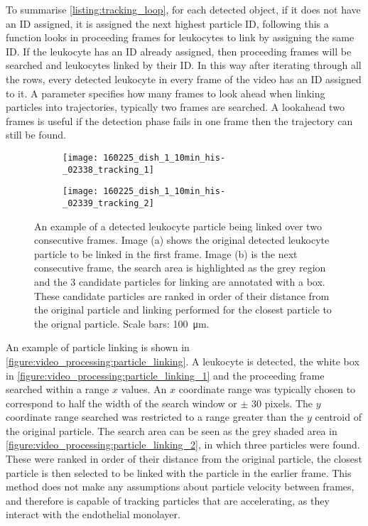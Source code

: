 To summarise \autoref{listing:tracking_loop}, for each detected object, if it does not have an ID assigned, it is assigned the next highest particle ID, following this a function looks in proceeding frames for leukocytes to link by assigning the same ID. If the leukocyte has an ID already assigned, then proceeding frames will be searched and leukocytes linked by their ID. In this way after iterating through all the rows, every detected leukocyte in every frame of the video has an ID assigned to it. A parameter specifies how many frames to look ahead when linking particles into trajectories, typically two frames are searched. A lookahead two frames is useful if the detection phase fails in one frame then the trajectory can still be found.

\begin{figure}[htbp]{}
	\centering
	\begin{subfigure}[b]{0.49\linewidth}
		\texttt{[image: 160225\_dish\_1\_10min\_his-\_02338\_tracking\_1]}
		\caption{}
		\label{figure:video_processing:particle_linking_1}
	\end{subfigure}
	\begin{subfigure}[b]{0.49\linewidth}
		\texttt{[image: 160225\_dish\_1\_10min\_his-\_02339\_tracking\_2]}
		\caption{}
		\label{figure:video_processing:particle_linking_2}
	\end{subfigure}
\caption[Leukocyte particle linking]{An example of a detected leukocyte particle being linked over two consecutive frames. Image (a) shows the original detected leukocyte particle to be linked in the first frame. Image (b) is the next consecutive frame, the search area is highlighted as the grey region and the 3 candidate particles for linking are annotated with a box. These candidate particles are ranked in order of their distance from the original particle and linking performed for the closest particle to the orignal particle. Scale bars: \SI{100}{\micro\meter}.}
\label{figure:video_processing:particle_linking}
\end{figure}

An example of particle linking is shown in \autoref{figure:video_processing:particle_linking}. A leukocyte is detected, the white box in \autoref{figure:video_processing:particle_linking_1} and the proceeding frame searched within a range $x$ values. An $x$ coordinate range was typically chosen to correspond to half the width of the search window or $\pm$ 30 pixels. The $y$ coordinate range searched was restricted to a range greater than the $y$ centroid of the original particle. The search area can be seen as the grey shaded area in \autoref{figure:video_processing:particle_linking_2}, in which three particles were found. These were ranked in order of their distance from the original particle, the closest particle is then selected to be linked with the particle in the earlier frame. This method does not make any assumptions about particle velocity between frames, and therefore is capable of tracking particles that are accelerating, as they interact with the endothelial monolayer.


